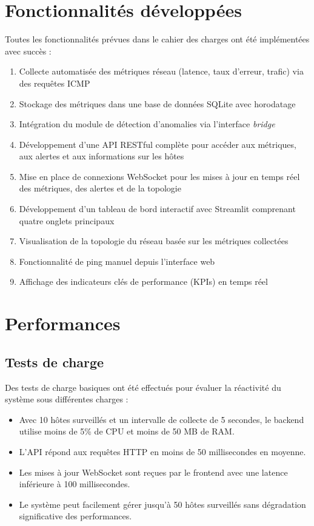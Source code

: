\documentclass[12pt,a4paper]{report}
\begin{document}
\section{Fonctionnalités développées}
Toutes les fonctionnalités prévues dans le cahier des charges ont été implémentées avec succès :
\begin{enumerate}
    \item Collecte automatisée des métriques réseau (latence, taux d'erreur, trafic) via des requêtes ICMP
    \item Stockage des métriques dans une base de données SQLite avec horodatage
    \item Intégration du module de détection d'anomalies via l'interface \textit{bridge}
    \item Développement d'une API RESTful complète pour accéder aux métriques, aux alertes et aux informations sur les hôtes
    \item Mise en place de connexions WebSocket pour les mises à jour en temps réel des métriques, des alertes et de la topologie
    \item Développement d'un tableau de bord interactif avec Streamlit comprenant quatre onglets principaux
    \item Visualisation de la topologie du réseau basée sur les métriques collectées
    \item Fonctionnalité de ping manuel depuis l'interface web
    \item Affichage des indicateurs clés de performance (KPIs) en temps réel
\end{enumerate}

\section{Performances}
\subsection{Tests de charge}
Des tests de charge basiques ont été effectués pour évaluer la réactivité du système sous différentes charges :
\begin{itemize}
    \item Avec 10 hôtes surveillés et un intervalle de collecte de 5 secondes, le backend utilise moins de 5\% de CPU et moins de 50 MB de RAM.
    \item L'API répond aux requêtes HTTP en moins de 50 millisecondes en moyenne.
    \item Les mises à jour WebSocket sont reçues par le frontend avec une latence inférieure à 100 millisecondes.
    \item Le système peut facilement gérer jusqu'à 50 hôtes surveillés sans dégradation significative des performances.
\end{itemize}
\end{document}
